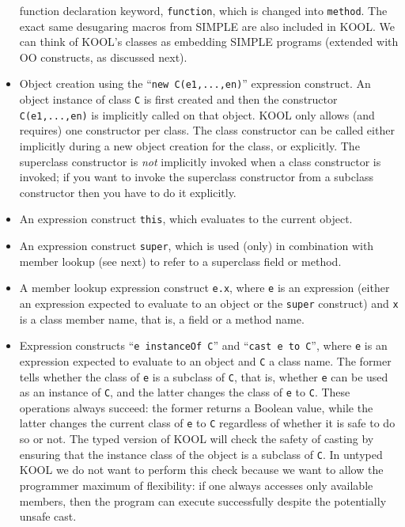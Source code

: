 \begin{kblock}[text]
\begin{itemize}
function declaration keyword, \texttt{function}, which is changed into
\texttt{method}.  The exact same desugaring macros from SIMPLE are
also included in KOOL.  We can think of KOOL's classes as embedding
SIMPLE programs (extended with OO constructs, as discussed next).
\item Object creation using the ``\texttt{new C(e1,...,en)}'' expression
construct.  An object instance of class \texttt{C} is first created and then
the constructor \texttt{C(e1,...,en)} is implicitly called on that
object.  KOOL only allows (and requires) one constructor per class.
The class constructor can be called either implicitly during a new
object creation for the class, or explicitly.  The superclass
constructor is {\em not} implicitly invoked when a class constructor
is invoked; if you want to invoke the superclass constructor from a
subclass constructor then you have to do it explicitly.
\item An expression construct \texttt{this}, which evaluates to the current
object.
\item An expression construct \texttt{super}, which is used (only) in
combination with member lookup (see next) to refer to a superclass field or
method.
\item A member lookup expression construct \texttt{e.x}, where \texttt{e}
is an expression (either an expression expected to evaluate to an object
or the \texttt{super} construct) and \texttt{x} is a class member name,
that is, a field or a method name.
\item Expression constructs ``\texttt{e instanceOf C}'' and
``\texttt{cast e to C}'', where \texttt{e} is an expression expected
to evaluate to an object and \texttt{C} a class name.  The former
tells whether the class of \texttt{e} is a subclass of \texttt{C},
that is, whether \texttt{e} can be used as an instance of \texttt{C},
and the latter changes the class of \texttt{e} to \texttt{C}.  These
operations always succeed: the former returns a Boolean value, while
the latter changes the current class of \texttt{e} to \texttt{C}
regardless of whether it is safe to do so or not.  The typed version
of KOOL will check the safety of casting by ensuring that the instance
class of the object is a subclass of \texttt{C}.  In untyped KOOL we
do not want to perform this check because we want to allow the
programmer maximum of flexibility: if one always accesses only
available members, then the program can execute successfully despite
the potentially unsafe cast.
\end{itemize}


\end{kblock}
